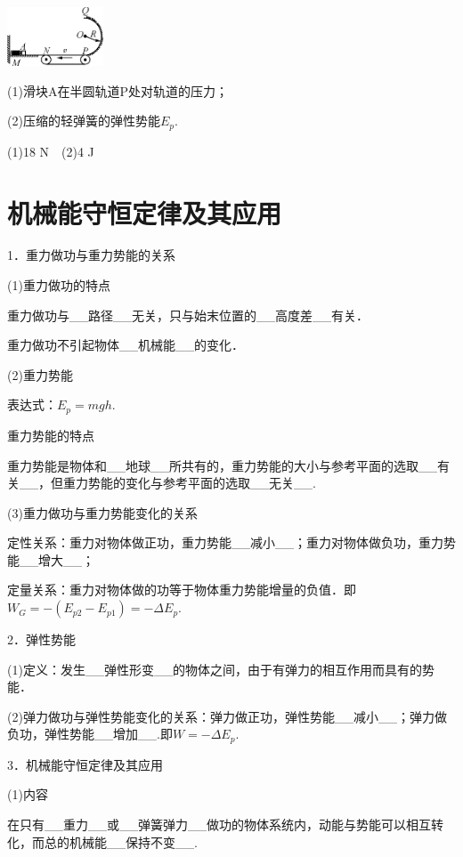 \documentclass[cn,10.5pt,chinese,mac,chinesefont=founder]{elegantbook}
\begin{document}
\begin{center}\includegraphics[width=1.12292in,height=0.68889in]{media/image227.png}\end{center}

(1)滑块A在半圆轨道P处对轨道的压力；

(2)压缩的轻弹簧的弹性势能$E_p$.
\begin{solution}
	(1)18 N　(2)4 J
\end{solution}

\newpage
\section{机械能守恒定律及其应用}


1．重力做功与重力势能的关系

(1)重力做功的特点

重力做功与\_\_路径\_\_无关，只与始末位置的\_\_高度差\_\_有关．

重力做功不引起物体\_\_机械能\_\_的变化．

(2)重力势能

表达式：$E_p=mgh$.

重力势能的特点

重力势能是物体和\_\_地球\_\_所共有的，重力势能的大小与参考平面的选取\_\_有关\_\_，但重力势能的变化与参考平面的选取\_\_无关\_\_.

(3)重力做功与重力势能变化的关系

定性关系：重力对物体做正功，重力势能\_\_减小\_\_；重力对物体做负功，重力势能\_\_增大\_\_；

定量关系：重力对物体做的功等于物体重力势能增量的负值．即$W_G=-(E_{p2}-E_{p1})=-\Delta E_p$.

2．弹性势能

(1)定义：发生\_\_弹性形变\_\_的物体之间，由于有弹力的相互作用而具有的势能．

(2)弹力做功与弹性势能变化的关系：弹力做正功，弹性势能\_\_减小\_\_；弹力做负功，弹性势能\_\_增加\_\_.即$W=-\Delta E_p$.

3．机械能守恒定律及其应用

(1)内容

在只有\_\_重力\_\_或\_\_弹簧弹力\_\_做功的物体系统内，动能与势能可以相互转化，而总的机械能\_\_保持不变\_\_.
\end{document}
